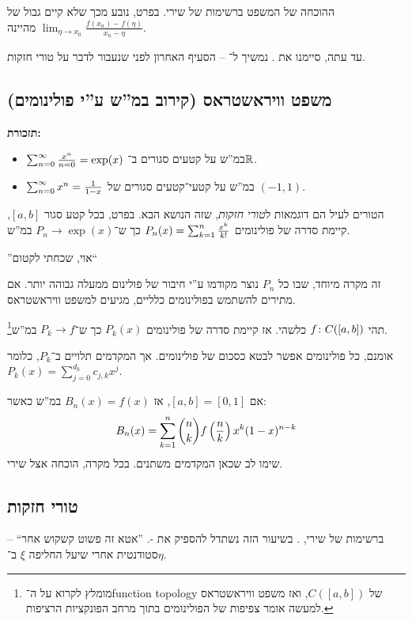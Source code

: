 \documentclass[name=רשימות חדו''א 2א]{../../../tex/classes/noChapterMegasumPreamble}
\begin{document}
	ההוכחה של המשפט ברשימות של שירי. בפרט, נובע מכך שלא קיים גבול של $\lim_{\eta \to x_0}\frac{f(x_n) - f(\eta)}{x_n - \eta}$ מהיינה.

	עד עתה, סיימנו את . נמשיך ל־ – הסעיף האחרון לפני שנעבור לדבר על טורי חזקות.
\subsection{משפט וויראשטראס (קירוב במ''ש ע''י פולינומים)}
	\textbf{תזכורת: }
	\begin{itemize}
		\item $\sum_{n = 0}^{\infty} \frac{x^{n}}{n = 0} = \exp(x)$ במ''ש על קטעים סגורים ב־$\mathbb{R}$.
		\item $\sum_{n = 0}^{\infty} x^{n} = \frac{1}{1- x}$ במ''ש על קטעי־קטעים סגורים של $(-1, 1)$.
	\end{itemize}
	הטורים לעיל הם דוגמאות ל\textit{טורי חזקות}, שזה הנושא הבא. בפרט, בכל קטע סגור $[a, b]$, קיימת סדרה של פולינומים $P_n(x) = \sum_{k = 1}^{n} \frac{x^{k}}{k!}$ כך ש־$P_n \to \exp(x)$ במ''ש.

	''אוי, שכחתי לקטום``

	זה מקרה מיוחד, שבו כל $P_n$ נוצר מקודמו ע''י חיבור של פולינום ממעלה גבוהה יותר. אם מתירים להשתמש בפולינומים כלליים, מגיעים למשפט וויראשטראס.
	\begin{Theorem}[וויראטשראס]
		תהי $f \colon C([a, b])$ כלשהי. אז קיימת סדרה של פולינומים $P_k(x)$ כך ש־$P_k \to f$ במ''ש\footnote{מומלץ לקרוא על ה־function topology של $C([a, b])$, ואז משפט וויראשטראס למעשה אומר צפיפות של הפולינומים בתוך מרחב הפונקציות הרציפות. }.
	\end{Theorem}
	אומנם, כל פולינומים אפשר לבטא כסכום של פולינומים. אך המקדמים תלויים ב־$P_k$, כלומר $P_k(x) = \sum_{j = 0}^{d_k}c_{j, k}x^{j}$.

	אם $[a, b] = [0, 1]$, אז $B_n(x) = f(x)$ במ''ש כאשר:
	\[ B_n(x) = \sum_{k = 1}^{n} \binom{n}{k}f\left ( \frac{n}{k} \right )x^{k}(1 - x)^{n - k} \]
	שימו לב שכאן המקדמים משתנים. בכל מקרה, הוכחה אצל שירי.

\subsection{טורי חזקות}
	ברשימות של שירי, . בשיעור הזה נשתדל להספיק את -.
	''אטא זה פשוט קשקוש אחר`` – סטודנטית אחרי שיעל החליפה $\xi$ ב־$\eta$.
\end{document}

